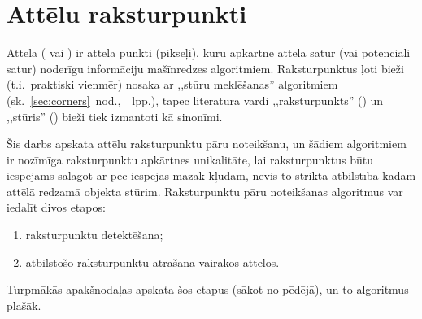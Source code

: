 \section{Attēlu raksturpunkti} \label{sec:algo}
Attēla  ( vai )
ir attēla punkti (pikseļi), kuru apkārtne attēlā 
satur (vai potenciāli satur) noderīgu informāciju mašīnredzes algoritmiem.
Raksturpunktus ļoti bieži (t.i.~praktiski vienmēr)
nosaka ar ,,stūru meklēšanas'' algoritmiem
(sk.~\ref{sec:corners}~nod.,~\pageref{sec:corners}~lpp.),
tāpēc literatūrā vārdi ,,raksturpunkts'' () un ,,stūris''
() bieži tiek izmantoti kā sinonīmi.

Šis darbs apskata attēlu raksturpunktu pāru noteikšanu, un šādiem
algoritmiem ir
nozīmīga raksturpunktu apkārtnes unikalitāte,
lai raksturpunktus būtu iespējams salāgot ar pēc iespējas mazāk kļūdām,
nevis to strikta atbilstība kādam attēlā redzamā objekta stūrim.
Raksturpunktu pāru noteikšanas algoritmus var iedalīt divos etapos:
\begin{enumerate}
	\item raksturpunktu detektēšana;
	\item atbilstošo raksturpunktu atrašana vairākos attēlos.
\end{enumerate}
Turpmākās apakšnodaļas apskata šos etapus (sākot no pēdējā),
un to algoritmus plašāk.



